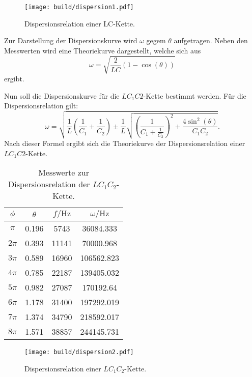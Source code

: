 \begin{figure}
  \centering
  \texttt{[image: build/dispersion1.pdf]}
\caption{Dispersionsrelation einer LC-Kette.}
  \label{fig:dispersion-lc}
\end{figure}

Zur Darstellung der Dispersionskurve wird $\omega$ gegem $\theta$ aufgetragen. Neben den Messwerten wird eine Theoriekurve dargestellt, welche sich aus
\begin{equation}
  \omega = \sqrt{\frac{2}{LC}(1-\cos(\theta))}
\end{equation}
ergibt.

 Nun soll die Dispersionskurve für die $LC_{1}C{2}$-Kette bestimmt werden.
 Für die Dispersionsrelation gilt:
 \begin{equation}
  \omega = \sqrt{\frac{1}{L}\left(\frac{1}{C_{1}}+\frac{1}{C_{2}}\right)\pm\frac{1}{L}\sqrt{\left(\frac{1}{C_{1}+\frac{1}{C_2}}\right)^2 + \frac{4\sin^2(\theta)}{C_{1}C_{2}}}}.
  \end{equation}
  Nach dieser Formel ergibt sich die Theoriekurve der Dispersionsrelation einer $LC_{1}C{2}$-Kette.

\begin{table}
  \centering
  \caption{Messwerte zur Dispersionsrelation der $LC_{1}C_{2}$-Kette.}
  \label{tab:dispersion1}
  \begin{tabular}{c c c c}
    \toprule
    $\phi$ & $\theta$ & $f / \si{\hertz}$ & $\omega / \si{\hertz}$ \\
    \midrule
    $\pi$ & 0.196 & 5743 & 36084.333 \\
    $2\pi$ & 0.393 & 11141 & 70000.968 \\
    $3\pi$ & 0.589 & 16960 & 106562.823 \\
    $4\pi$ & 0.785 & 22187 & 139405.032 \\
    $5\pi$ & 0.982 & 27087 & 170192.64 \\
    $6\pi$ & 1.178 & 31400 & 197292.019 \\
    $7\pi$ & 1.374 & 34790 & 218592.017 \\
    $8\pi$ & 1.571 & 38857 & 244145.731 \\
    \bottomrule
    \end{tabular}
  \end{table}

  \begin{figure}
    \centering
    \texttt{[image: build/dispersion2.pdf]}
  \caption{Dispersionsrelation einer $LC_{1}C_{2}$-Kette.}
    \label{fig:dispersion-lc1c2}
  \end{figure}

